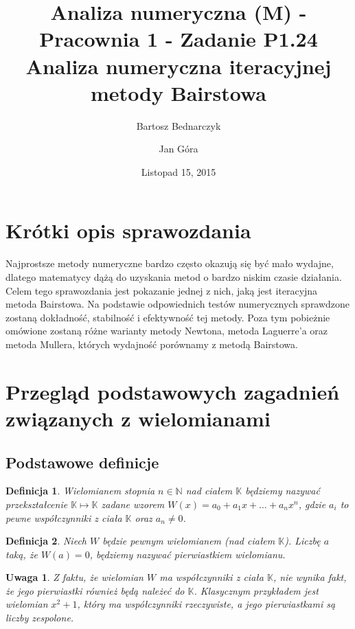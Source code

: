 \documentclass{article}
\title{Analiza numeryczna (M) - Pracownia 1 - Zadanie P1.24\\
Analiza numeryczna iteracyjnej metody Bairstowa}
\date{Listopad 15, 2015}
\author{Bartosz Bednarczyk\\ \and Jan Góra}
\newtheorem{remark}{Uwaga}
\newtheorem{definicja}{Definicja}
\begin{document}
\maketitle

\tableofcontents

\section*{Krótki opis sprawozdania}

Najprostsze metody numeryczne bardzo często okazują się być mało wydajne, dlatego matematycy dążą do uzyskania metod o bardzo niskim czasie działania. Celem tego sprawozdania jest pokazanie jednej z nich, jaką jest iteracyjna metoda Bairstowa. Na podstawie odpowiednich testów numerycznych sprawdzone zostaną dokładność, stabilność i efektywność tej metody. Poza tym pobieżnie omówione zostaną różne warianty metody Newtona, metoda Laguerre'a oraz metoda Mullera, których wydajność porównamy z metodą Bairstowa.	
\section{Przegląd podstawowych zagadnień związanych z wielomianami}

\subsection{Podstawowe definicje}

\begin{definicja}
Wielomianem stopnia $n \in \mathbb{N}$ nad ciałem $\mathbb{K}$ będziemy nazywać przekształcenie $\mathbb{K} \mapsto \mathbb{K}$ zadane wzorem $W(x) = a_0 + a_1x + \ldots + a_n x^n$, gdzie $a_i$ to pewne  współczynniki z ciała $\mathbb{K}$ oraz $a_n \neq 0$.
\end{definicja}

\begin{definicja}
Niech $W$ będzie pewnym wielomianem (nad ciałem $\mathbb{K}$). Liczbę $a$ taką, że $W(a) = 0$, będziemy nazywać pierwiastkiem wielomianu.
\end{definicja}

\begin{remark}
Z faktu, że wielomian $W$ ma współczynniki z ciała $\mathbb{K}$, nie wynika fakt, że jego pierwiastki również będą należeć do $\mathbb{K}$. Klasycznym przykładem jest wielomian $x^2 + 1$, który ma współczynniki rzeczywiste, a jego pierwiastkami są liczby zespolone.
\end{remark}
\end{document}
